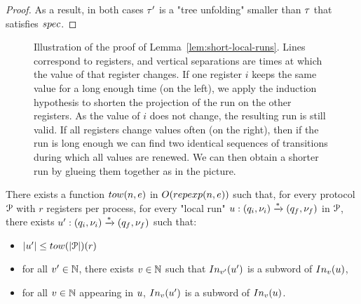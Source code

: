 \begin{proof}
	As a result, in both cases $\tau'$ is a "tree unfolding" smaller than $\tau$ that satisfies $\spec$. 
\end{proof}
\fi

\begin{figure}
	
	\caption{Illustration of the proof of Lemma~\ref{lem:short-local-runs}. Lines correspond to registers, and vertical separations are times at which the value of that register changes. If one register $i$ keeps the same value for a long enough time (on the left), we apply the induction hypothesis to shorten the projection of the run on the other registers. As the value of $i$ does not change, the resulting run is still valid. If all registers change values often (on the right), then if the run is long enough we can find two identical sequences of transitions during which all values are renewed. We can then obtain a shorter run by glueing them together as in the picture.}
\end{figure}




\begin{lemma}
	\label{lem:short-local-runs}
	There exists a function $\towerfun(n, e)$ in $O(\repexp{n}{e})$ such that, for every protocol $\mathcal{P}$ with $r$ registers per process, for every "local run" $u: (q_i, \nu_i) \xrightarrow{*} (q_f, \nu_f)$ in $\mathcal{P}$, there exists $u': (q_i, \nu_i) \xrightarrow{*} (q_f, \nu_f)$ such that:
	\begin{itemize}
		\item  $\length{\localrun'} \leq \towerfun(\size{\prot})(r)$
		\item for all $v' \in \mathbb{N}$, there exists $v \in \mathbb{N}$ such that $\vinput{\aval'}{\localrun'}$ is a subword of $\vinput{\aval}{\localrun}$,
		\item for all $v \in \mathbb{N}$ appearing in $u$, $\vinput{\aval}{\localrun'}$ is a subword of $\vinput{\aval}{\localrun}$. 
	\end{itemize}
\end{lemma}

